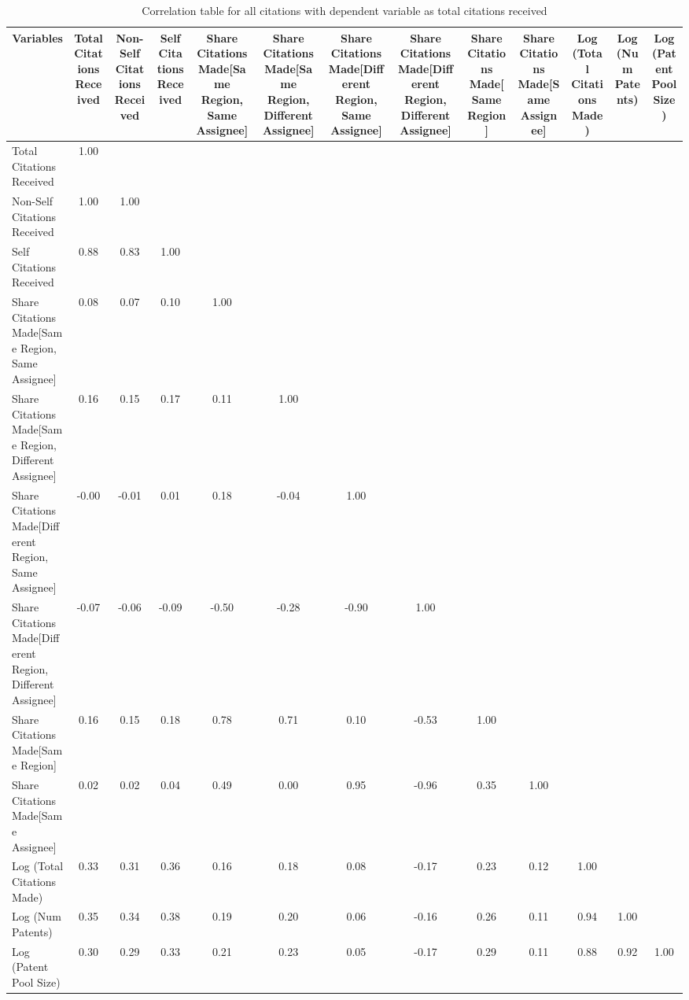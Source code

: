 \begin{table}[htbp]\centering \caption{Correlation table for all citations with dependent variable as total citations received\label{a.e.o.t.n.tcorrelation}}
\begin{tabular}{l  c  c  c  c  c  c  c  c  c  c  c  c }\hline\hline
\multicolumn{1}{c}{Variables} &Total Citations Received&Non-Self Citations Received&Self Citations Received&Share Citations Made[Same Region, Same Assignee]&Share Citations Made[Same Region, Different Assignee]&Share Citations Made[Different Region, Same Assignee]&Share Citations Made[Different Region, Different Assignee]&Share Citations Made[Same Region]&Share Citations Made[Same Assignee]&Log (Total Citations Made)&Log (Num Patents)&Log (Patent Pool Size)\\ \hline
Total Citations Received&1.00\\
Non-Self Citations Received&1.00&1.00\\
Self Citations Received&0.88&0.83&1.00\\
Share Citations Made[Same Region, Same Assignee]&0.08&0.07&0.10&1.00\\
Share Citations Made[Same Region, Different Assignee]&0.16&0.15&0.17&0.11&1.00\\
Share Citations Made[Different Region, Same Assignee]&-0.00&-0.01&0.01&0.18&-0.04&1.00\\
Share Citations Made[Different Region, Different Assignee]&-0.07&-0.06&-0.09&-0.50&-0.28&-0.90&1.00\\
Share Citations Made[Same Region]&0.16&0.15&0.18&0.78&0.71&0.10&-0.53&1.00\\
Share Citations Made[Same Assignee]&0.02&0.02&0.04&0.49&0.00&0.95&-0.96&0.35&1.00\\
Log (Total Citations Made)&0.33&0.31&0.36&0.16&0.18&0.08&-0.17&0.23&0.12&1.00\\
Log (Num Patents)&0.35&0.34&0.38&0.19&0.20&0.06&-0.16&0.26&0.11&0.94&1.00\\
Log (Patent Pool Size)&0.30&0.29&0.33&0.21&0.23&0.05&-0.17&0.29&0.11&0.88&0.92&1.00\\
\hline \hline 
 \end{tabular}
\end{table}
